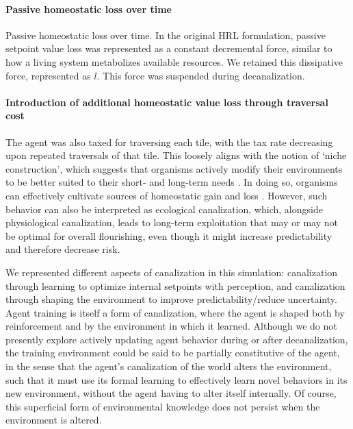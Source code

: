 \paragraph{Passive homeostatic loss over time}

Passive homeostatic loss over time. In the original HRL formulation, passive setpoint value loss was represented as a constant decremental force, similar to how a living system metabolizes available resources. We retained this dissipative force, represented as \(l\). This force was suspended during decanalization. 

\paragraph{Introduction of additional homeostatic value loss through traversal cost}

The agent was also taxed for traversing each tile, with the tax rate decreasing upon repeated traversals of that tile. This loosely aligns with the notion of ‘niche construction’, which suggests that organisms actively modify their environments to be better suited to their short- and long-term needs \cite{pio-lopez_scale-free_2025}. In doing so, organisms can effectively cultivate sources of homeostatic gain and loss \cite{lyon_reframing_2021}. However, such behavior can also be interpreted as ecological canalization, which, alongside physiological canalization, leads to long-term exploitation that may or may not be optimal for overall flourishing, even though it might increase predictability and therefore decrease risk. 

We represented different aspects of canalization in this simulation: canalization through learning to optimize internal setpoints with perception, and canalization through shaping the environment to improve predictability/reduce uncertainty. Agent training is itself a form of canalization, where the agent is shaped both by reinforcement and by the environment in which it learned. Although we do not presently explore actively updating agent behavior during or after decanalization, the training environment could be said to be partially constitutive of the agent, in the sense that the agent's canalization of the world alters the environment, such that it must use its formal learning to effectively learn novel behaviors in its new environment, without the agent having to alter itself internally. Of course, this superficial form of environmental knowledge does not persist when the environment is altered. 

